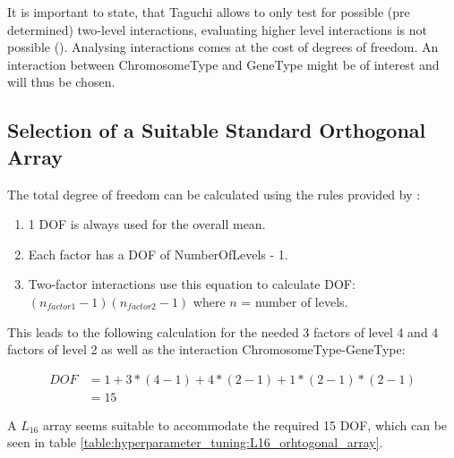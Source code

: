 It is important to state, that Taguchi allows to only test for possible (pre determined) two-level interactions, evaluating higher level interactions is not possible (\cite{yang_design_2009}). Analysing interactions comes at the cost of degrees of freedom. An interaction between ChromosomeType and GeneType might be of interest and will thus be chosen.

\subsection{Selection of a Suitable Standard Orthogonal Array}
\label{chap:hyperparameter_tuning:selection_orthogonal_array}
The total degree of freedom can be calculated using the rules provided by \cite{yang_design_2009}:

\begin{enumerate}
	\item 1 DOF is always used for the overall mean. 
	\item Each factor has a DOF of NumberOfLevels - 1.
	\item Two-factor interactions use this equation to calculate DOF: $(n_{factor1} - 1)(n_{factor2} - 1)$ where $n$ = number of levels.
\end{enumerate}

This leads to the following calculation for the needed 3 factors of level 4 and 4 factors of level 2 as well as the interaction ChromosomeType-GeneType:

\begin{equation} \label{DOF}
	\begin{split}
		DOF & = 1 + 3 * (4 - 1) + 4 * (2 - 1) + 1 * (2 - 1) * (2 - 1) \\
		& = 15
	\end{split}
\end{equation}

A $L_{16}$ array seems suitable to accommodate the required 15 DOF, which can be seen in table \ref{table:hyperparameter_tuning:L16_orhtogonal_array}.

